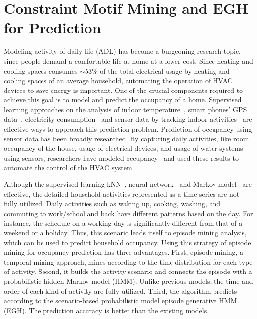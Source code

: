 \section{Constraint Motif Mining and EGH for Prediction}
Modeling activity of daily life (ADL) has become a burgeoning research topic, 
since people demand a comfortable life at home
at a lower cost. 
Since heating and cooling spaces consumes $\sim$53\% of the total electrical usage 
by heating and cooling spaces %
of an average household, 
automating the operation of HVAC devices to save energy is important. 
One of the crucial components required to achieve this goal is 
to model and predict the occupancy of a home. 
Supervised learning approaches on the analysis of indoor temperature~\cite{kleiminger2014predicting}, 
smart phones' GPS data~\cite{koehler2013therml}, 
electricity consumption~\cite{erickson2010occupancy} and 
sensor data by tracking indoor activities~\cite{scott2011preheat,alrazgan2011learning} 
are effective ways to approach this prediction problem. 
Prediction of occupancy using sensor data has been broadly researched. 
By capturing daily activities, like room occupancy of the house, 
usage of electrical devices, 
and usage of water systems using sensors, 
researchers have modeled occupancy~\cite{mahmoud2013behavioural,erickson2010occupancy,beltran2014optimal} 
and used these results to automate the control of the HVAC system. 

Although the supervised learning kNN~\cite{scott2011preheat}, 
neural network~\cite{mahmoud2013behavioural} and Markov model~\cite{erickson2010occupancy} 
are effective, 
the detailed household activities represented as a time series are not fully utilized. 
Daily activities such as waking up, cooking, washing, and commuting to work/school and back 
have different patterns based on the day. 
For instance, the schedule on a working day is significantly different from that of a weekend 
or a holiday. 
Thus, this scenario leads itself to episode mining analysis, 
which can be used to predict household occupancy. 
Using this strategy of episode mining for occupancy prediction has three advantages. 
First, episode mining, a temporal mining approach, mines according to the time 
distribution for each type of activity. 
Second, it builds the activity scenario and connects the episode with 
a probabilistic hidden Markov model (HMM). 
Unlike previous models, 
the time and order of each kind of activity are fully utilized. 
Third, the algorithm predicts according to the scenario-based probabilistic model episode 
generative HMM (EGH). The prediction accuracy is better than the existing models. 

